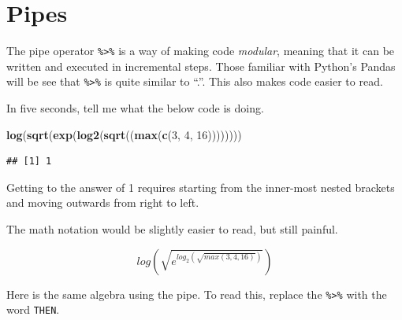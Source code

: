 \documentclass[openany]{book}
\newenvironment{Shaded}{\begin{snugshade}}{\end{snugshade}}
\newcommand{\DecValTok}[1]{\textcolor[rgb]{0.00,0.00,0.81}{#1}}
\newcommand{\KeywordTok}[1]{\textcolor[rgb]{0.13,0.29,0.53}{\textbf{#1}}}
\newcommand{\NormalTok}[1]{#1}
\newcommand{\OperatorTok}[1]{\textcolor[rgb]{0.81,0.36,0.00}{\textbf{#1}}}
\newcommand{\StringTok}[1]{\textcolor[rgb]{0.31,0.60,0.02}{#1}}
\begin{document}
\hypertarget{pipes}{%
\section{Pipes}\label{pipes}}

The pipe operator \texttt{\%\textgreater{}\%} is a way of making code \emph{modular}, meaning that it can
be written and executed in incremental steps. Those familiar with Python's Pandas
will be see that \texttt{\%\textgreater{}\%} is quite similar to ``.''. This also makes code easier to
read.

In five seconds, tell me what the below code is doing.

\begin{Shaded}
\begin{Highlighting}[]
\KeywordTok{log}\NormalTok{(}\KeywordTok{sqrt}\NormalTok{(}\KeywordTok{exp}\NormalTok{(}\KeywordTok{log2}\NormalTok{(}\KeywordTok{sqrt}\NormalTok{((}\KeywordTok{max}\NormalTok{(}\KeywordTok{c}\NormalTok{(}\DecValTok{3}\NormalTok{, }\DecValTok{4}\NormalTok{, }\DecValTok{16}\NormalTok{))))))))}
\end{Highlighting}
\end{Shaded}

\begin{verbatim}
## [1] 1
\end{verbatim}

Getting to the answer of 1 requires starting from the inner-most nested brackets
and moving outwards from right to left.

The math notation would be slightly easier to read, but still painful.

\[log(\sqrt{e^{log_2(\sqrt{max(3,4,16)})}})\]

Here is the same algebra using the pipe. To read this, replace the \texttt{\%\textgreater{}\%} with
the word \texttt{THEN}.

\begin{Shaded}
\end{Shaded}
\end{document}
